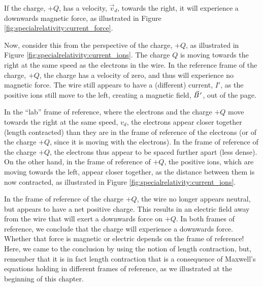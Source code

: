 If the charge, $+Q$, has a velocity, $\vec v_d$, towards the right, it will experience a downwards magnetic force, as illustrated in Figure \ref{fig:specialrelativity:current_force}.

Now, consider this from the perspective of the charge, $+Q$, as illustrated in Figure \ref{fig:specialrelativity:current_ions}. The charge $Q$ is moving towards the right at the same speed as the electrons in the wire. In the reference frame of the charge, $+Q$, the charge has a velocity of zero, and thus will experience no magnetic force. The wire still appears to have a (different) current, $I'$, as the positive ions still move to the left, creating a magnetic field, $\pvec B'$, out of the page.

In the ``lab'' frame of reference, where the electrons and the charge $+Q$ move towards the right at the same speed, $v_d$, the electrons appear closer together (length contracted) than they are in the frame of reference of the electrons (or of the charge $+Q$, since it is moving with the electrons). In the frame of reference of the charge $+Q$, the electrons thus appear to be spaced further apart (less dense). On the other hand, in the frame of reference of $+Q$, the positive ions, which are moving towards the left, appear closer together, as the distance between them is now contracted, as illustrated in Figure \ref{fig:specialrelativity:current_ions}.

In the frame of reference of the charge $+Q$, the wire no longer appears neutral, but appears to have a net positive charge. This results in an electric field away from the wire that will exert a downwards force on $+Q$. In both frames of reference, we conclude that the charge will experience a downwards force. Whether that force is magnetic or electric depends on the frame of reference! Here, we came to the conclusion by using the notion of length contraction, but, remember that it is in fact length contraction that is a consequence of Maxwell's equations holding in different frames of reference, as we illustrated at the beginning of this chapter. 

